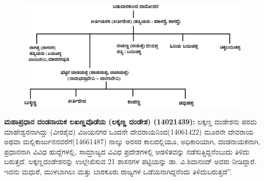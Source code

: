 \begin{figure}[H]
\includegraphics[scale=1.17]{images/chap3/chap3fig37.jpeg}
\end{figure}

\textbf{ಮಹಾಪ್ರಧಾನ ದಂಡನಾಯಕ ಲಖಣ್ಣವೊಡೆಯ (ಲಕ್ಕಣ್ಣ ದಂಡೇಶ) (1402\general{\enginline{-}}1439):} ಲಕ್ಕಣ್ಣ ದಂಡೇಶನು ಪರಮ ಮಾಹೇಶ್ವರನಾಗಿದ್ದು (ವೀರಶೈವ) ವಿಜಯನಗರ ಒಂದನೇ ದೇವರಾಯನಿಂದ(1406\enginline{-}1422) ಮೂರನೇ ದೇವರಾಯ ಅಥವಾ ಮಲ್ಲಿಕಾರ್ಜುನನವರೆಗೆ(1466\enginline{-}1487) ನಾಲ್ಕು ಅರಸರ ಕಾಲದಲ್ಲಿಯೂ, ಅಧಿಕಾರಿಯಾಗಿ, ದಂಡನಾಯಕನಾಗಿ, ಪ್ರಧಾನನಾಗಿ ವಿವಿಧ ಹುದ್ದೆಗಳಲ್ಲಿ, ಸಾಮ್ರಾಜ್ಯದ ವಿವಿಧ ಪ್ರದೇಶಗಳಲ್ಲಿ ಆಡಳಿತವನ್ನು ನಡೆಸುತ್ತಿದ್ದನೆಂಬುದು ತಿಳಿದು ಬರುತ್ತದೆ. ಲಕ್ಕಣ್ಣದಂಡೇಶನನ್ನು ಉಲ್ಲೇಖಿಸುವ 21 ಶಾಸನಗಳ ಪಟ್ಟಿಯನ್ನು ಡಾ. ವಿ.ಶಿವಾನಂದ್​ ಅವರು ನೀಡಿದ್ದಾರೆ. ಇವನು ಮಧುರೆ, ಮುಳಬಾಗಿಲು ಮತ್ತು ಬಾರಕೂರು ರಾಜ್ಯಗಳ ಒಡೆಯನಾಗಿದ್ದನೆಂದು ತಿಳಿದುಬರುತ್ತದೆ”.

